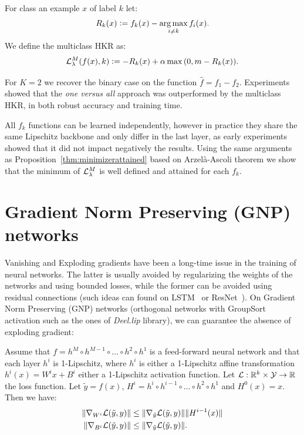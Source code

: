     \begin{definition}\label{def:multiclasshkr}
        For class an example $x$ of label $k$ let:
        $$R_k(x)\vcentcolon= f_k(x)-\operatorname*{arg\,max}_{i\neq k}f_i(x).$$
        We define the multiclass HKR as:
        $$\mathcal{L}^M_{\lambda}(f(x),k)\vcentcolon=-R_k(x)+\alpha\max{(0, m-R_k(x))}.$$
    \end{definition}  
      
    For $K=2$ we recover the binary case on the function $\hat f=f_1-f_2$. Experiments showed that the \textit{one versus all} approach was outperformed by the multiclass HKR, in both robust accuracy and training time.  
      
    All $f_k$ functions can be learned independently, however in practice they share the same Lipschitz backbone and only differ in the last layer, as early experiments showed that it did not impact negatively the results. Using the same arguments as Proposition~\ref{thm:minimizerattained} based on Arzelà-Ascoli theorem we show that the minimum of $\mathcal{L}^M_{\lambda}$ is well defined and attained for each $f_k$. %
  
\section{Gradient Norm Preserving (GNP) networks}\label{app:gradientpreserving}
  
Vanishing and Exploding gradients have been a long-time issue in the training of neural networks. The latter is usually avoided by regularizing the weights of the networks and using bounded losses, while the former can be avoided using residual connections (such ideas can found on LSTM~\cite{gers1999learning} or ResNet~\cite{he2016deep}). On Gradient Norm Preserving (GNP) networks (orthogonal networks with GroupSort activation such as the ones of \textit{Deel.lip} library), we can guarantee the absence of exploding gradient:  
  
\begin{proposition}\label{thm:noexploding}
Assume that $f = h^M\circ h^{M-1}\circ\ldots \circ h^2\circ h^1$ is a feed-forward neural network and that each layer $h^i$ is \mbox{1-Lipschitz}, where $h^i$ is either a \mbox{1-Lipschitz} affine transformation $h^i(x)=W^ix+B^i$ either a \mbox{1-Lipschitz} activation function. Let $\mathcal{L}:\mathbb{R}^k\times\mathcal{Y}\rightarrow\mathbb{R}$ the loss function. Let $\tilde{y}=f(x)$, $H^i=h^i\circ h^{i-1}\circ\ldots\circ h^2\circ h^1$ and $H^0(x)=x$. Then we have:
\begin{align}
    \|\nabla_{W^i}\mathcal{L}(\tilde{y},y)\|&\leq\|\nabla_{\tilde{y}}\mathcal{L}(\tilde{y},y)\|\|H^{i-1}(x)\|\\
    \|\nabla_{B^i}\mathcal{L}(\tilde{y},y)\|&\leq\|\nabla_{\tilde{y}}\mathcal{L}(\tilde{y},y)\|.
\end{align}
\end{proposition}  
  
